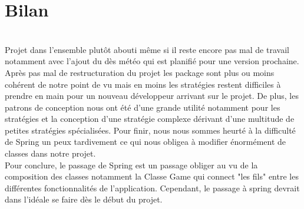\chapter{Bilan}
~\\
Projet dans l'ensemble plutôt abouti même si il  reste encore pas mal de travail notamment avec l'ajout du dès météo qui est planifié pour une version prochaine. Après pas mal de restructuration du projet les package sont plus ou moins cohérent de notre point de vu mais en moins les stratégies restent difficiles à prendre en main pour un nouveau développeur arrivant sur le projet. De plus, les patrons de conception nous ont été d'une grande utilité notamment pour les stratégies et la conception d'une stratégie complexe dérivant d'une multitude de petites stratégies spécialisées. Pour finir, nous nous sommes heurté à la difficulté de Spring un peux tardivement ce qui nous obligea à modifier énormément de classes dans notre projet.\\


Pour conclure, le passage de Spring est un passage obliger au vu de la composition des classes notamment la Classe Game qui connect "les fils" entre les différentes fonctionnalités de l'application. Cependant, le passage à spring devrait dans l'idéale se faire dès le début du projet.